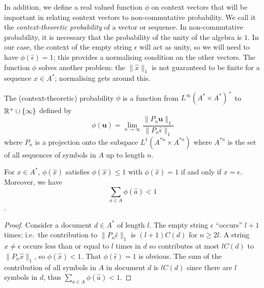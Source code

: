 \documentclass[12pt]{report}
\begin{document}
In addition, we define a real valued function $\phi$ on context vectors that will be important in relating context vectors to non-commutative probability. We call it the \emph{context-theoretic probability} of a vector or sequence. In non-commutative probability, it is necessary that the probability of the unity of the algebra is $1$. In our case, the context of the empty string $\epsilon$ will act as unity, so we will need to have $\phi(\hat{\epsilon}) = 1$; this provides a normalising condition on the other vectors. The function $\phi$ solves another problem: the $\|\hat{x}\|_1$ is not guaranteed to be finite for a sequence $x \in A^*$; normalising gets around this.
\begin{defn}[Probability]
The (context-theoretic) probability $\phi$ is a function from $L^\infty(A^*\times A^*)^+$ to $\mathbb{R}^+\cup\{\infty\}$ defined by
$$\phi(\mathbf{u}) = \lim_{n\rightarrow\infty} \frac{\|P_n\mathbf{u}\|_1}{\|P_n\hat{\epsilon}\|_1}$$
where $P_n$ is a projection onto the subspace $L^1(A^{*n}\times A^{*n})$ where $A^{*n}$ is the set of all sequences of symbols in $A$ up to length $n$.
\end{defn}

\begin{prop}
For $x \in A^*$, $\phi(\hat{x})$ satisfies $\phi(\hat{x}) \le 1$ with $\phi(\hat{x}) = 1$ if and only if $x = \epsilon$. Moreover, we have
$$\sum_{a \in A} \phi(\hat{a}) < 1$$.
\end{prop}

\begin{proof}
Consider a document $d\in A^*$ of length $l$. The empty string $\epsilon$ ``occurs'' $l+1$ times; i.e.~the contribution to $\|P_n \hat{\epsilon}\|_1$ is $(l+1)C(d)$ for $n \ge 2l$. A string $x \neq \epsilon$ occurs less than or equal to $l$ times in $d$ so contributes at most $lC(d)$ to $\|P_n\hat{x}\|_1$, so $\phi(\hat{x}) < 1$. That $\phi(\hat{\epsilon}) = 1$ is obvious. The sum of the contribution of all symbols in $A$ in document $d$ is $lC(d)$ since there are $l$ symbols in $d$, thus $\sum_{a \in A} \phi(\hat{a}) < 1$.
\end{proof}

 
\end{document}
